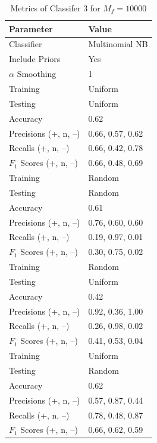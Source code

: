 \documentclass[11pt]{article}
\begin{document}
\begin{table}[!h]
	\begin{center}
		\begin{tabular}{|l|l|}			
			\hline
			Parameter & Value \\
			\hline\hline
			Classifier & Multinomial NB \\
			Include Priors & Yes \\
			$\alpha$ Smoothing & 1 \\
			\hline\hline
			Training & Uniform \\
			Testing & Uniform \\
			\hline
			Accuracy & 0.62 \\
			Precisions (+, n, --) &  0.66, 0.57, 0.62 \\
			Recalls (+, n, --) & 0.66, 0.42, 0.78 \\
			$F_1$ Scores (+, n, --) & 0.66, 0.48, 0.69 \\
			\hline\hline
			Training & Random \\
			Testing & Random \\
			\hline
			Accuracy & 0.61 \\
			Precisions (+, n, --) &  0.76, 0.60, 0.60 \\
			Recalls (+, n, --) & 0.19, 0.97, 0.01 \\
			$F_1$ Scores (+, n, --) & 0.30, 0.75, 0.02 \\
			\hline\hline
			Training & Random \\
			Testing & Uniform \\
			\hline
			Accuracy & 0.42 \\
			Precisions (+, n, --) &  0.92, 0.36, 1.00 \\
			Recalls (+, n, --) & 0.26, 0.98, 0.02 \\
			$F_1$ Scores (+, n, --) & 0.41, 0.53, 0.04 \\
			\hline\hline
			Training & Uniform \\
			Testing & Random \\
			\hline
			Accuracy & 0.62 \\
			Precisions (+, n, --) &  0.57, 0.87, 0.44 \\
			Recalls (+, n, --) & 0.78, 0.48, 0.87 \\
			$F_1$ Scores (+, n, --) & 0.66, 0.62, 0.59 \\
			\hline
		\end{tabular}
		\caption{Metrics of Classifer 3 for $M_f = 10000$}
		\label{tbl:metrics-3rd10000}
	\end{center}
\end{table}
\end{document}
